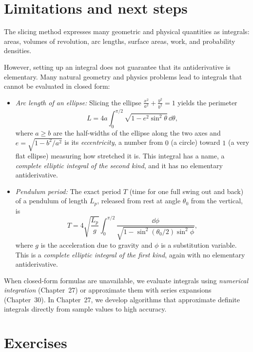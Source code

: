 \section{Limitations and next steps}

\begin{connectionbox}
The slicing method expresses many geometric and physical quantities as integrals:
areas, volumes of revolution, arc lengths, surface areas, work, and probability densities.

However, setting up an integral does not guarantee that its antiderivative is elementary.
Many natural geometry and physics problems lead to integrals that cannot be evaluated
in closed form:
\begin{itemize}
  \item \emph{Arc length of an ellipse:} Slicing the ellipse $\frac{x^2}{a^2} + \frac{y^2}{b^2} = 1$
  yields the perimeter
  \[
    L = 4a \int_0^{\pi/2} \sqrt{1 - e^2 \sin^2\theta}\,\dd\theta,
  \]
  where $a \ge b$ are the half-widths of the ellipse along the two axes and
  $e = \sqrt{1 - b^2/a^2}$ is its \emph{eccentricity}, a number from $0$ (a circle)
  toward $1$ (a very flat ellipse) measuring how stretched it is. This integral has a
  name, a \emph{complete elliptic integral of the second kind}, and it has no
  elementary antiderivative.
  \item \emph{Pendulum period:} The exact period $T$ (time for one full swing out and
  back) of a pendulum of length $L_p$, released from rest at angle $\theta_0$ from
  the vertical, is
  \[
    T = 4\sqrt{\frac{L_p}{g}} \int_0^{\pi/2} \frac{\dd\phi}{\sqrt{1 - \sin^2(\theta_0/2)\sin^2\phi}},
  \]
  where $g$ is the acceleration due to gravity and $\phi$ is a substitution
  variable. This is a \emph{complete elliptic integral of the first kind}, again with
  no elementary antiderivative.
\end{itemize}

When closed-form formulas are unavailable, we evaluate integrals using \emph{numerical integration}
(Chapter~27) or approximate them with series expansions (Chapter~30). In Chapter~27, we
develop algorithms that approximate definite integrals directly from sample values to high accuracy.
\end{connectionbox}

\section{Exercises}
\label{ch26:exercises}

